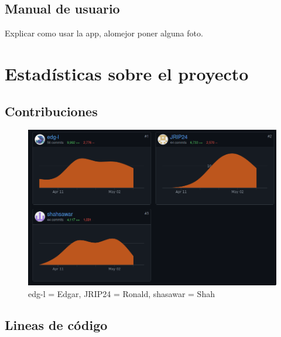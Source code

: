 \documentclass[12pt,a4paper]{article}
\begin{document}
\clearpage

\subsection{Manual de usuario}
Explicar como usar la app, alomejor poner alguna foto.

\newpage

\section{Estadísticas sobre el proyecto}

\subsection{Contribuciones}

\begin{figure}[h]
 	\centering
	\includegraphics[width=\textwidth]{git-contributors}
	\caption{edg-l = Edgar, JRIP24 = Ronald, shasawar = Shah}
\end{figure}

\subsection{Lineas de código}
\end{document}
